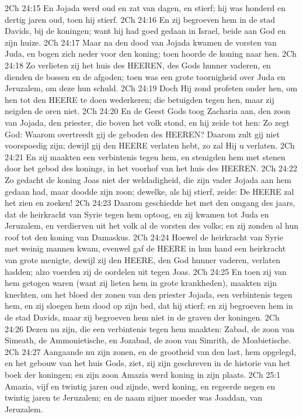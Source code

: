 2Ch 24:15  En Jojada werd oud en zat van dagen, en stierf; hij was honderd en dertig jaren oud, toen hij stierf.
2Ch 24:16  En zij begroeven hem in de stad Davids, bij de koningen; want hij had goed gedaan in Israel, beide aan God en zijn huize.
2Ch 24:17  Maar na den dood van Jojada kwamen de vorsten van Juda, en bogen zich neder voor den koning; toen hoorde de koning naar hen.
2Ch 24:18  Zo verlieten zij het huis des HEEREN, des Gods hunner vaderen, en dienden de bossen en de afgoden; toen was een grote toornigheid over Juda en Jeruzalem, om deze hun schuld.
2Ch 24:19  Doch Hij zond profeten onder hen, om hen tot den HEERE te doen wederkeren; die betuigden tegen hen, maar zij neigden de oren niet.
2Ch 24:20  En de Geest Gods toog Zacharia aan, den zoon van Jojada, den priester, die boven het volk stond, en hij zeide tot hen: Zo zegt God: Waarom overtreedt gij de geboden des HEEREN? Daarom zult gij niet voorspoedig zijn; dewijl gij den HEERE verlaten hebt, zo zal Hij u verlaten.
2Ch 24:21  En zij maakten een verbintenis tegen hem, en stenigden hem met stenen door het gebod des konings, in het voorhof van het huis des HEEREN.
2Ch 24:22  Zo gedacht de koning Joas niet der weldadigheid, die zijn vader Jojada aan hem gedaan had, maar doodde zijn zoon; dewelke, als hij stierf, zeide: De HEERE zal het zien en zoeken!
2Ch 24:23  Daarom geschiedde het met den omgang des jaars, dat de heirkracht van Syrie tegen hem optoog, en zij kwamen tot Juda en Jeruzalem, en verdierven uit het volk al de vorsten des volks; en zij zonden al hun roof tot den koning van Damaskus.
2Ch 24:24  Hoewel de heirkracht van Syrie met weinig mannen kwam, evenwel gaf de HEERE in hun hand een heirkracht van grote menigte, dewijl zij den HEERE, den God hunner vaderen, verlaten hadden; alzo voerden zij de oordelen uit tegen Joas.
2Ch 24:25  En toen zij van hem getogen waren (want zij lieten hem in grote krankheden), maakten zijn knechten, om het bloed der zonen van den priester Jojada, een verbintenis tegen hem, en zij sloegen hem dood op zijn bed, dat hij stierf; en zij begroeven hem in de stad Davids, maar zij begroeven hem niet in de graven der koningen.
2Ch 24:26  Dezen nu zijn, die een verbintenis tegen hem maakten: Zabad, de zoon van Simeath, de Ammonietische, en Jozabad, de zoon van Simrith, de Moabietische.
2Ch 24:27  Aangaande nu zijn zonen, en de grootheid van den last, hem opgelegd, en het gebouw van het huis Gods, ziet, zij zijn geschreven in de historie van het boek der koningen; en zijn zoon Amazia werd koning in zijn plaats.
2Ch 25:1  Amazia, vijf en twintig jaren oud zijnde, werd koning, en regeerde negen en twintig jaren te Jeruzalem; en de naam zijner moeder was Joaddan, van Jeruzalem.
